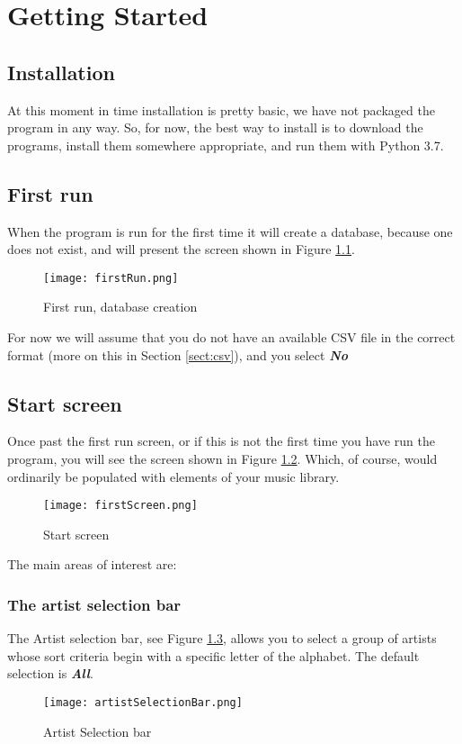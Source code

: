 \chapter{Getting Started}
\section{Installation}
At this moment in time installation is pretty basic, we have not packaged the program in any way.  So, for now, the best way to install is to download the programs, install them somewhere appropriate, and run them with Python 3.7.
 
\section{First run}
When the program is run for the first time it will create a database, because one does not exist, and will present the screen shown in Figure \ref{fig:firstrun}.
\begin{figure}[h]
\texttt{[image: firstRun.png]}
\caption{First run, database creation}
\label{fig:firstrun}
\end{figure}
For now we will assume that you do not have an available CSV file in the correct format (more on this in Section \ref{sect:csv}), and you select \textbf{\textit{No}}

\section{Start screen}
Once past the first run screen, or if this is not the first time you have run the program, you will see the screen shown in Figure \ref{fig:firstscreen}. Which, of course, would ordinarily be populated with elements of your music library.
\begin{figure}[h]
\texttt{[image: firstScreen.png]}
\caption{Start screen}
\label{fig:firstscreen}
\end{figure}
The main areas of interest are:

\subsection{The artist selection bar}
The Artist selection bar, see Figure \ref{fig:artistselectionbar}, allows you to select a group of artists whose sort criteria begin with a specific letter of the alphabet.  The default selection is \textbf{\textit{All}}.
\begin{figure}[h]
\texttt{[image: artistSelectionBar.png]}
\caption{Artist Selection bar}
\label{fig:artistselectionbar}
\end{figure}

